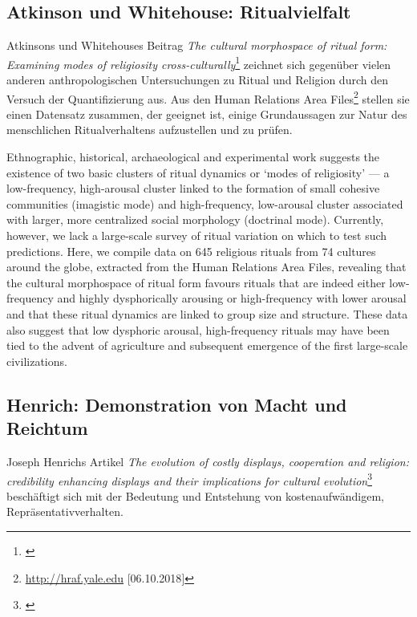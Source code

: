 \documentclass[openany,twoside,twocolumn]{book}
\let\rmarkdownfootnote\footnote%
\def\footnote{\protect\rmarkdownfootnote}
\begin{document}
\hypertarget{atkinson-und-whitehouse-ritualvielfalt}{%
\subsection{Atkinson und Whitehouse:
Ritualvielfalt}\label{atkinson-und-whitehouse-ritualvielfalt}}

Atkinsons und Whitehouses Beitrag \emph{The cultural morphospace of
ritual form: Examining modes of religiosity cross-culturally}\footnote{\textcite{atkinson_cultural_2011}}
zeichnet sich gegenüber vielen anderen anthropologischen Untersuchungen
zu Ritual und Religion durch den Versuch der Quantifizierung aus. Aus
den Human Relations Area Files\footnote{\url{http://hraf.yale.edu}
  {[}06.10.2018{]}} stellen sie einen Datensatz zusammen, der geeignet
ist, einige Grundaussagen zur Natur des menschlichen Ritualverhaltens
aufzustellen und zu prüfen.

Ethnographic, historical, archaeological and experimental work suggests
the existence of two basic clusters of ritual dynamics or `modes of
religiosity' --- a low-frequency, high-arousal cluster linked to the
formation of small cohesive communities (imagistic mode) and
high-frequency, low-arousal cluster associated with larger, more
centralized social morphology (doctrinal mode). Currently, however, we
lack a large-scale survey of ritual variation on which to test such
predictions. Here, we compile data on 645 religious rituals from 74
cultures around the globe, extracted from the Human Relations Area
Files, revealing that the cultural morphospace of ritual form favours
rituals that are indeed either low-frequency and highly dysphorically
arousing or high-frequency with lower arousal and that these ritual
dynamics are linked to group size and structure. These data also suggest
that low dysphoric arousal, high-frequency rituals may have been tied to
the advent of agriculture and subsequent emergence of the first
large-scale civilizations.

\hypertarget{henrich-demonstration-von-macht-und-reichtum}{%
\subsection{Henrich: Demonstration von Macht und
Reichtum}\label{henrich-demonstration-von-macht-und-reichtum}}

Joseph Henrichs Artikel \emph{The evolution of costly displays,
cooperation and religion: credibility enhancing displays and their
implications for cultural evolution}\footnote{\textcite{henrich_evolution_2009}}
beschäftigt sich mit der Bedeutung und Entstehung von kostenaufwändigem,
Repräsentativverhalten.
\end{document}
